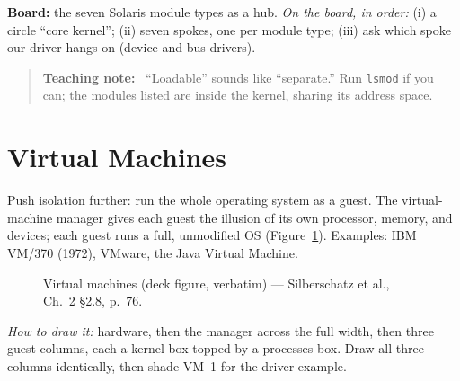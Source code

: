 \documentclass[11pt]{article}
\newenvironment{teachingaside}{\begin{quote}\small\color{primary-gold}\textbf{Teaching note:}\ }{\end{quote}}
\begin{document}
\textbf{Board:} the seven Solaris module types as a hub. \emph{On the board, in order:} (i) a circle ``core kernel''; (ii) seven spokes, one per module type; (iii) ask which spoke our driver hangs on (device and bus drivers).

\begin{teachingaside}
``Loadable'' sounds like ``separate.'' Run \texttt{lsmod} if you can; the modules listed are inside the kernel, sharing its address space.
\end{teachingaside}

\section{Virtual Machines}

Push isolation further: run the whole operating system as a guest. The virtual-machine manager gives each guest the illusion of its own processor, memory, and devices; each guest runs a full, unmodified OS (Figure~\ref{fig:vm}). Examples: IBM VM/370 (1972), VMware, the Java Virtual Machine.

\begin{figure}[h]
\centering
{}
\caption{Virtual machines (deck figure, verbatim) --- Silberschatz et al., Ch.~2 \S2.8, p.~76.}
\label{fig:vm}
\end{figure}

\emph{How to draw it:} hardware, then the manager across the full width, then three guest columns, each a kernel box topped by a processes box. Draw all three columns identically, then shade VM~1 for the driver example.
\end{document}
